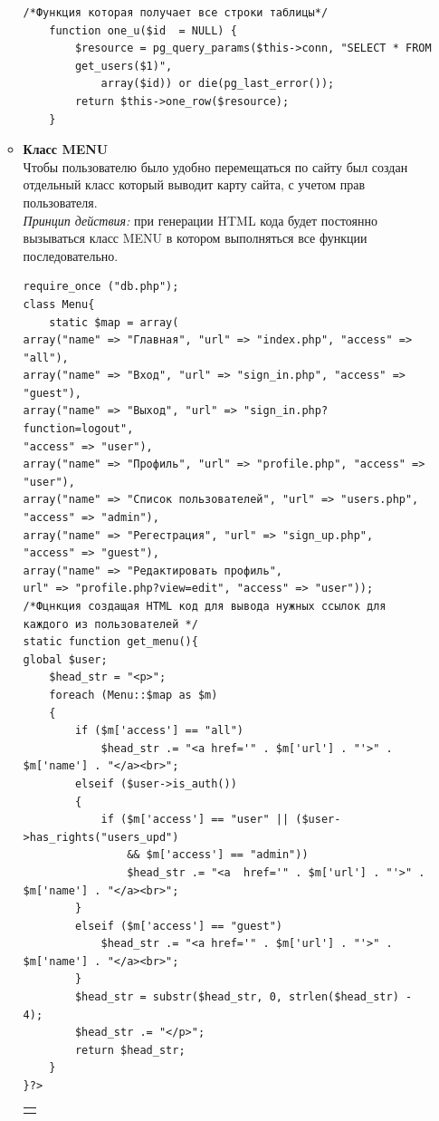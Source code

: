 \documentclass[a4paper]{article}
\begin{document}
\begin{enumerate}
\begin{itemize}
\begin{small}
\begin{verbatim}
/*Функция которая получает все строки таблицы*/    
    function one_u($id  = NULL) {
        $resource = pg_query_params($this->conn, "SELECT * FROM
        get_users($1)",
            array($id)) or die(pg_last_error());
        return $this->one_row($resource);
    }
\end{verbatim}
\end{small}
\item \textbf{Класс MENU}\\   
Чтобы пользователю было удобно перемещаться по сайту был создан отдельный класс который выводит карту сайта, с учетом прав пользователя.\\ \textsl{Принцип действия:} при генерации HTML кода будет постоянно вызываться класс MENU в котором выполняться все функции последовательно.  
\begin{small}
\begin{verbatim}    
require_once ("db.php");
class Menu{
    static $map = array(
array("name" => "Главная", "url" => "index.php", "access" => "all"),
array("name" => "Вход", "url" => "sign_in.php", "access" => "guest"),
array("name" => "Выход", "url" => "sign_in.php?function=logout",
"access" => "user"),
array("name" => "Профиль", "url" => "profile.php", "access" => "user"), 
array("name" => "Список пользователей", "url" => "users.php",
"access" => "admin"),
array("name" => "Регестрация", "url" => "sign_up.php",
"access" => "guest"),
array("name" => "Редактировать профиль", 
url" => "profile.php?view=edit", "access" => "user"));
/*Фцнкция создащая HTML код для вывода нужных ссылок для
каждого из пользователей */    
static function get_menu(){
global $user;
    $head_str = "<p>";
    foreach (Menu::$map as $m)
    {
        if ($m['access'] == "all")
            $head_str .= "<a href='" . $m['url'] . "'>" . $m['name'] . "</a><br>";
        elseif ($user->is_auth())
        {
            if ($m['access'] == "user" || ($user->has_rights("users_upd") 
                && $m['access'] == "admin"))
                $head_str .= "<a  href='" . $m['url'] . "'>" . $m['name'] . "</a><br>";
        }
        elseif ($m['access'] == "guest")
            $head_str .= "<a href='" . $m['url'] . "'>" . $m['name'] . "</a><br>";
        }
        $head_str = substr($head_str, 0, strlen($head_str) - 4);
        $head_str .= "</p>";
        return $head_str;
    }
}?>
\end{verbatim}
\end{small}
\begin{tabular}{l}
\begin{minipage}{\textwidth}

\end{minipage}
\end{tabular}
\end{itemize}
\end{enumerate}
\end{document}

